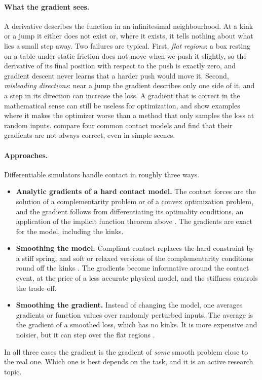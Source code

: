 \paragraph{What the gradient sees.}
A derivative describes the function in an infinitesimal neighbourhood. At
a kink or a jump it either does not exist or, where it exists, it tells
nothing about what lies a small step away. Two failures are typical.
First, \emph{flat regions}: a box resting on a table under static friction
does not move when we push it slightly, so the derivative of its final
position with respect to the push is exactly zero, and gradient descent
never learns that a harder push would move it. Second, \emph{misleading
directions}: near a jump the gradient describes only one side of it, and a
step in its direction can increase the loss. A gradient that is correct
in the mathematical sense can still be useless for optimization, and
\citet{suh2022differentiable} show examples where it makes the optimizer
worse than a method that only samples the loss at random inputs. \citet{zhong2022differentiable} compare
four common contact models and find that their gradients are not always
correct, even in simple scenes.

\paragraph{Approaches.}
Differentiable simulators handle contact in roughly three ways.
\begin{itemize}
  \item \textbf{Analytic gradients of a hard contact model.} The contact
    forces are the solution of a complementarity problem or of a convex
    optimization problem, and the gradient follows from differentiating
    its optimality conditions, an application of the implicit function
    theorem above \citep{belbuteperes2018endtoend,werling2021fast,howell2022dojo}.
    The gradients are exact for the model, including the kinks.
  \item \textbf{Smoothing the model.} Compliant contact replaces the hard
    constraint by a stiff spring, and soft or relaxed versions of the
    complementarity conditions round off the kinks \citep{geilinger2020add}.
    The gradients become informative around the contact event, at the
    price of a less accurate physical model, and the stiffness controls
    the trade-off.
  \item \textbf{Smoothing the gradient.} Instead of changing the model,
    one averages gradients or function values over randomly perturbed
    inputs. The average is the gradient of a smoothed loss, which has no
    kinks. It is more expensive and noisier, but it can step over the
    flat regions \citep{suh2022differentiable}.
\end{itemize}
In all three cases the gradient is the gradient of \emph{some} smooth
problem close to the real one. Which one is best depends on the task, and
it is an active research topic.

